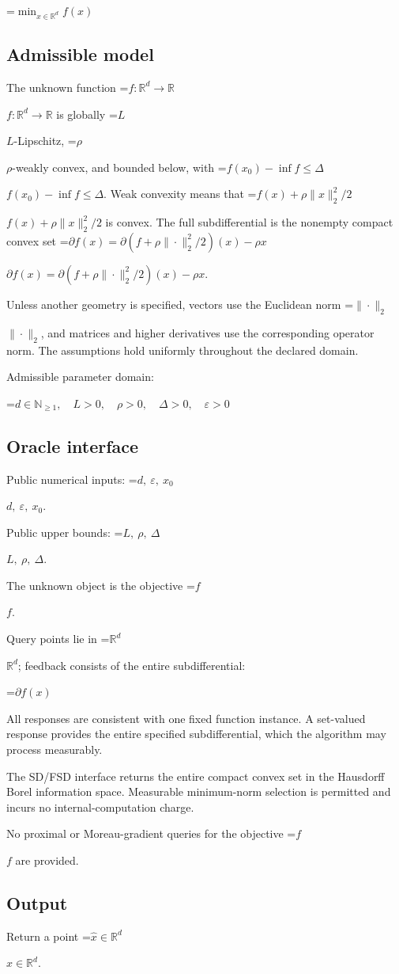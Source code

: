 \documentclass[10pt,a4paper]{article}
\newcommand{\AtlasMath}[1]{\par\begingroup\centering\setbox0=\hbox{$\displaystyle #1$}\ifdim\wd0>1.4\linewidth\typeout{ATLAS WIDE FORMULA: \the\wd0}\fi\ifdim\wd0>\linewidth\resizebox{\linewidth}{!}{\box0}\else\box0\fi\par\endgroup}
\newcommand{\AtlasInlineMath}[1]{\begingroup\setbox0=\hbox{$#1$}\ifdim\wd0>.4\linewidth\endgroup\AtlasMath{#1}\else\endgroup$#1$\fi}
\begin{document}
\AtlasMath{\min_{x\in \mathbb{R}^d}f(x)}


\subsection{Admissible model}
The unknown function \AtlasInlineMath{f:\mathbb R^d\to\mathbb R} is globally \AtlasInlineMath{L}-Lipschitz, \AtlasInlineMath{\rho}-weakly convex, and bounded below, with \AtlasInlineMath{f(x_0)-\inf f\le\Delta}. Weak convexity means that \AtlasInlineMath{f(x)+\rho\|x\|_2^2/2} is convex. The full subdifferential is the nonempty compact convex set \AtlasInlineMath{\partial f(x)=\partial(f+\rho\|\cdot\|_2^2/2)(x)-\rho x}.

Unless another geometry is specified, vectors use the Euclidean norm \AtlasInlineMath{\|\cdot\|_2}, and matrices and higher derivatives use the corresponding operator norm. The assumptions hold uniformly throughout the declared domain.

Admissible parameter domain:


\AtlasMath{d\in\mathbb{N}_{\ge1},\quad L>0,\quad \rho>0,\quad \Delta>0,\quad \varepsilon>0}


\subsection{Oracle interface}
Public numerical inputs: \AtlasInlineMath{d,\ \varepsilon,\ x_0}.

Public upper bounds: \AtlasInlineMath{L,\ \rho,\ \Delta}.

The unknown object is the objective \AtlasInlineMath{f}.

Query points lie in \AtlasInlineMath{\mathbb{R}^d}; feedback consists of the entire subdifferential:


\AtlasMath{\partial f(x)}


All responses are consistent with one fixed function instance. A set-valued response provides the entire specified subdifferential, which the algorithm may process measurably.

The SD/FSD interface returns the entire compact convex set in the Hausdorff Borel information space. Measurable minimum-norm selection is permitted and incurs no internal-computation charge.

No proximal or Moreau-gradient queries for the objective \AtlasInlineMath{f} are provided.

\subsection{Output}
Return a point \AtlasInlineMath{\widehat x\in\mathbb R^d}.
\end{document}
